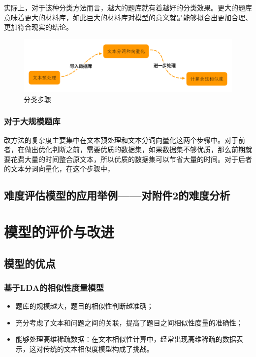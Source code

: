 实际上，对于该种分类方法而言，越大的题库就有着越好的分类效果。更大的题库意味着更大的材料库，如此巨大的材料库对模型的意义就是能够拟合出更加合理、更加符合现实的结论。

\begin{figure}[h]
    \centering
    \includegraphics[scale=0.3]{res/figure041640.png}
    \caption{分类步骤}
\end{figure}

\subsubsection{对于大规模题库}

改方法的复杂度主要集中在文本预处理和文本分词向量化这两个步骤中。对于前者，在做出优化判断之前，需要优质的数据集，如果数据集不够优质，那么前期就要花费大量的时间整合原文本，所以优质的数据集可以节省大量的时间。对于后者的文本分词向量化，在这个步骤中，

\subsection{难度评估模型的应用举例——对附件2的难度分析}



%
%

\section{模型的评价与改进}

\subsection{模型的优点}

\subsubsection{基于LDA的相似性度量模型}

\begin{itemize}
    \item 题库的规模越大，题目的相似性判断越准确；
    \item 充分考虑了文本和问题之间的关联，提高了题目之间相似性度量的准确性；
    \item 能够处理高维稀疏数据：在文本相似性计算中，经常出现高维稀疏的数据表示，这对传统的文本相似度模型构成了挑战。
\end{itemize}

